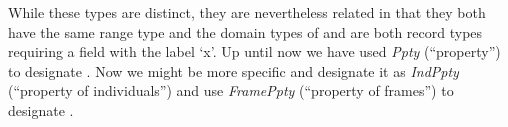 While these types are distinct, they are nevertheless related in that
they both have the same range type and the domain types of 
and  are both record types requiring a field with the label `x'.  Up until now we have
used \textit{Ppty} (``property'') to designate .  Now we
might be more specific and designate it as \textit{IndPpty}
(``property of individuals'') and use \textit{FramePpty} (``property
of frames'') to designate . %
 
 
 
   
